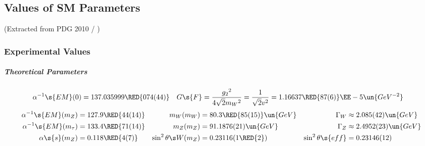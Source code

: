 \newpage

\subsection{Values of SM Parameters}
\newcommand{\upd}[1]{{\RED{#1}}}
\vskip-24pt\hskip200pt{\small(Extracted from PDG 2010 / \upd{2012})}
\subsubsection{Experimental Values}
\subparagraph{Theoretical Parameters}
\begin{align*}
 \alpha^{-1}\s{EM}(0) &= 137.035999\upd{074(44)} &
 G\s{F}       &= \frac{{g_2}^2}{4\sqrt2{m_W}^2} = \frac1{\sqrt2v^2} = 1.16637\upd{87(6)}\EE-5\un{GeV^{-2}}&
\end{align*}
\begin{align*}
 \alpha^{-1}\s{EM}(m_Z)    &= 127.9\upd{44(14)} &
 m_W(m_W)                  &= 80.3\upd{85(15)}\un{GeV} &
 \Gamma_W                  &\approx 2.085(42)\un{GeV}
\\
 \alpha^{-1}\s{EM}(m_\tau) &= 133.4\upd{71(14)} &
 m_Z(m_Z)                  &= 91.1876(21)\un{GeV} &
 \Gamma_Z                  &\approx 2.4952(23)\un{GeV}
\\
 \alpha\s{s}(m_Z)          &= 0.118\upd{4(7)}  &
 \sin^2\theta\s W(m_Z)     &= 0.23116(1\upd{2}) &
 \sin^2\theta\s{eff}       &= 0.23146(12)
\end{align*}

